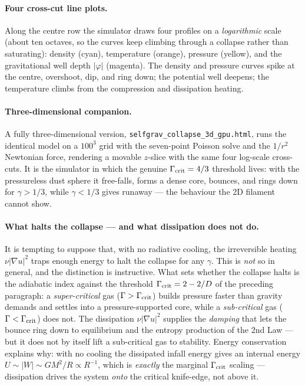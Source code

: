 \paragraph{Four cross-cut line plots.}
Along the centre row the simulator draws four profiles on a \emph{logarithmic}
scale (about ten octaves, so the curves keep climbing through a collapse rather
than saturating): density (cyan), temperature (orange), pressure (yellow), and
the gravitational well depth $|\varphi|$ (magenta). The density and pressure
curves spike at the centre, overshoot, dip, and ring down; the potential well
deepens; the temperature climbs from the compression and dissipation heating.

\paragraph{Three-dimensional companion.}
A fully three-dimensional version, \texttt{selfgrav\_collapse\_3d\_gpu.html},
runs the identical model on a $100^3$ grid with the seven-point Poisson solve and
the $1/r^2$ Newtonian force, rendering a movable $z$-slice with the same four
log-scale cross-cuts. It is the simulator in which the genuine
$\Gamma_{\rm crit}=4/3$ threshold lives: with the pressureless dust sphere it
free-falls, forms a dense core, bounces, and rings down for $\gamma>1/3$, while
$\gamma<1/3$ gives runaway --- the behaviour the 2D filament cannot show.

\paragraph{What halts the collapse --- and what dissipation does not do.}
It is tempting to suppose that, with no radiative cooling, the irreversible
heating $\nu|\nabla u|^2$ traps enough energy to halt the collapse for any
$\gamma$. This is \emph{not} so in general, and the distinction is instructive.
What sets whether the collapse halts is the adiabatic index against the
threshold $\Gamma_{\rm crit} = 2-2/D$ of the preceding paragraph: a
\emph{super-critical} gas ($\Gamma > \Gamma_{\rm crit}$) builds pressure faster
than gravity demands and settles into a pressure-supported core, while a
\emph{sub-critical} gas ($\Gamma < \Gamma_{\rm crit}$) does not. The dissipation
$\nu|\nabla u|^2$ supplies the \emph{damping} that lets the bounce ring down to
equilibrium and the entropy production of the 2nd Law --- but it does not by
itself lift a sub-critical gas to stability. Energy conservation explains why:
with no cooling the dissipated infall energy gives an internal energy
$U \sim |W| \sim GM^2/R \propto R^{-1}$, which is \emph{exactly} the marginal
$\Gamma_{\rm crit}$ scaling --- dissipation drives the system \emph{onto} the
critical knife-edge, not above it.

